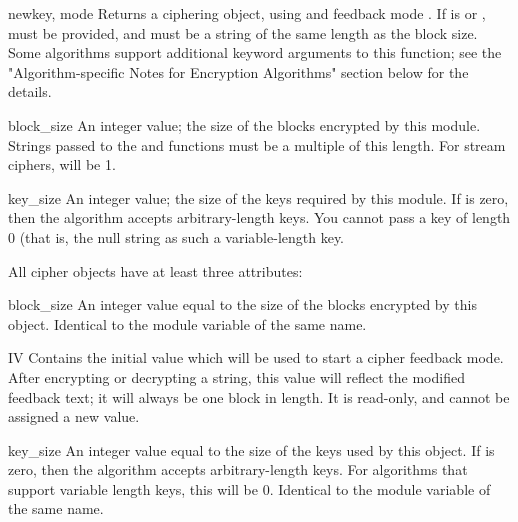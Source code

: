 \documentclass{howto}
\begin{document}
\begin{funcdesc}{new}{key, mode}
Returns a ciphering object, using  and feedback mode
.  If  is  or ,  must be provided,
and must be a string of the same length as the block size.  Some
algorithms support additional keyword arguments to this function; see
the "Algorithm-specific Notes for Encryption Algorithms" section below for the details.
\end{funcdesc}

\begin{datadesc}{block_size}
An integer value; the size of the blocks encrypted by this module.
Strings passed to the  and  functions
must be a multiple of this length.  For stream ciphers,
 will be 1. 
\end{datadesc}

\begin{datadesc}{key_size}
An integer value; the size of the keys required by this module.  If
 is zero, then the algorithm accepts arbitrary-length
keys.  You cannot pass a key of length 0 (that is, the null string
 as such a variable-length key.  
\end{datadesc}

All cipher objects have at least three attributes:

\begin{memberdesc}{block_size}
An integer value equal to the size of the blocks encrypted by this object.
Identical to the module variable of the same name.
\end{memberdesc}

\begin{memberdesc}{IV}
Contains the initial value which will be used to start a cipher
feedback mode.  After encrypting or decrypting a string, this value
will reflect the modified feedback text; it will always be one block
in length.  It is read-only, and cannot be assigned a new value.
\end{memberdesc}

\begin{memberdesc}{key_size}
An integer value equal to the size of the keys used by this object.  If
 is zero, then the algorithm accepts arbitrary-length
keys.  For algorithms that support variable length keys, this will be 0.
Identical to the module variable of the same name.  
\end{memberdesc}
\end{document}

